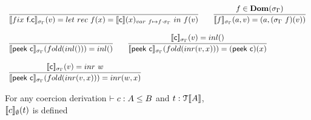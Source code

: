 \documentclass[a4paper,UKenglish,cleveref, autoref, thm-restate]{lipics-v2021}
\begin{document}
\begin{definition}[Interpretation]
\begin{displaymath}
\begin{array}{l}
\infer{\interp{\fix~\dslcom{f}.\dslcom{c}}_{\sigma_{\Gamma}}(v)=\rec{f}{x}{\interp{\dslcom{c}}(x)_{\mathsf{var~f} \mapsto f \cdot \sigma_{\Gamma}}}{f}(v)}{} \qquad
\infer{\interp{\mathsf{f}}_{\sigma_{\Gamma}}(a,v)=(a,(\sigma_{\Gamma}~\mathsf{f})(v))}{f \in \mathbf{Dom}(\sigma_{\Gamma})}
\\\\
\infer{\interpsig{peek c}{fold (inl ())}{inl ()}}{} \qquad
\infer{\interpsig{peek c}{fold (inr (v,x))}{(\dslcom{peek c})(x)}}{\interpsig{c}{v}{inl ()}}
\\\\
\infer{\interpsig{peek c}{fold (inr (v,x))}{inr (w,x)}}{\interpsig{c}{v}{inr~w}}
    \end{array}
  \end{displaymath}
\end{definition}
\begin{lemma}[Termination]
For any coercion derivation $\contains{}{c}{A}{B}$ and $\mathsf{t} : \type{A}$,\\ 
$\interp{c}_\emptyset(\mathsf{t})$ is defined  %
\end{lemma}
\end{document}
